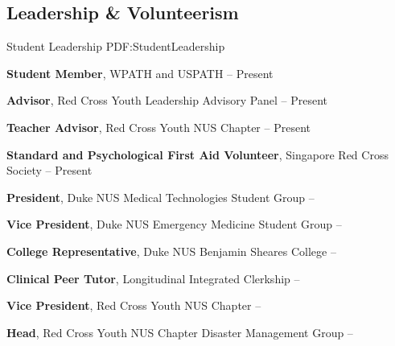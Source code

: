 \documentclass[letterpaper,10pt,oneside]{article}
\begin{document}
\begin{body}




\section
{Leadership \& Volunteerism}
{Student Leadership}
{PDF:StudentLeadership}

\textbf{Student Member}, WPATH and USPATH
\hfill
{} -- Present
\GapNoBreak

\textbf{Advisor}, Red Cross Youth Leadership Advisory Panel
\hfill
{} -- Present
\GapNoBreak

\textbf{Teacher Advisor}, Red Cross Youth NUS Chapter
\hfill
{} -- Present
\GapNoBreak

\textbf{Standard and Psychological First Aid Volunteer}, Singapore Red Cross Society
\hfill
{} -- Present
\GapNoBreak

\textbf{President}, Duke NUS Medical Technologies Student Group
\hfill
{} --  
\GapNoBreak

\textbf{Vice President}, Duke NUS Emergency Medicine Student Group
\hfill
{} --  
\GapNoBreak

\textbf{College Representative}, Duke NUS Benjamin Sheares College
\hfill
{} --  
\GapNoBreak

\textbf{Clinical Peer Tutor}, Longitudinal Integrated Clerkship
\hfill
{} --  
\GapNoBreak

\textbf{Vice President}, Red Cross Youth NUS Chapter
\hfill
{} --  
\GapNoBreak

\textbf{Head}, Red Cross Youth NUS Chapter Disaster Management Group
\hfill
{} --  
\GapNoBreak


\end{body}
\end{document}
